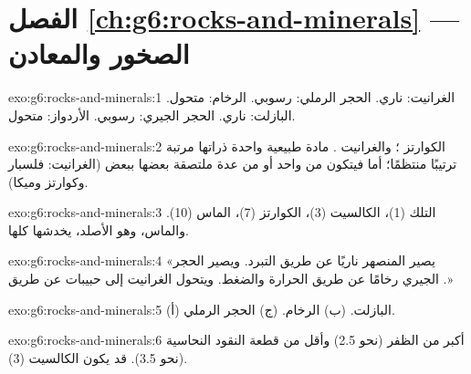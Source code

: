 \section*{الفصل \ref{ch:g6:rocks-and-minerals} --- الصخور والمعادن}

\begin{solution}{exo:g6:rocks-and-minerals:1}
الغرانيت: ناري. الحجر الرملي: رسوبي. الرخام: متحول. البازلت:
ناري. الحجر الجيري: رسوبي. الأردواز: متحول.
\end{solution}

\begin{solution}{exo:g6:rocks-and-minerals:2}
الكوارتز ؛ والغرانيت .  مادة طبيعية واحدة ذراتها مرتبة
ترتيبًا منتظمًا؛ أما  فيتكون من  واحد أو من عدة  ملتصقة
بعضها ببعض (الغرانيت: فلسبار وكوارتز وميكا).
\end{solution}

\begin{solution}{exo:g6:rocks-and-minerals:3}
التلك (1)، الكالسيت (3)، الكوارتز (7)، الماس (10). والماس، وهو الأصلد،
يخدشها كلها.
\end{solution}

\begin{solution}{exo:g6:rocks-and-minerals:4}
«يصير  المنصهر  ناريًا عن طريق التبرد. ويصير الحجر الجيري
رخامًا عن طريق الحرارة والضغط. ويتحول الغرانيت إلى حبيبات 
عن طريق .»
\end{solution}

\begin{solution}{exo:g6:rocks-and-minerals:5}
(أ) البازلت. (ب) الرخام. (ج) الحجر الرملي.
\end{solution}

\begin{solution}{exo:g6:rocks-and-minerals:6}
 أكبر من  الظفر (نحو 2.5) وأقل من  قطعة النقود
النحاسية (نحو 3.5). قد يكون الكالسيت (3).
\end{solution}

